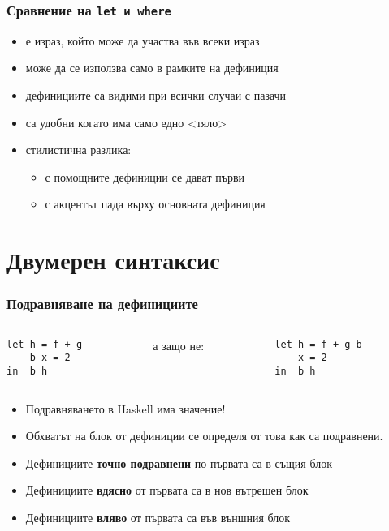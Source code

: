\documentclass[alsotrans,beameroptions={aspectratio=169}]{beamerswitch}
\begin{document}
\begin{frame}
  \frametitle{Сравнение на \tt{let} и \tt{where}}

  \begin{itemize}[<+->]
  \item {} е израз, който може да участва във всеки израз
  \item {} може да се използва само в рамките на дефиниция
  \item {} дефинициите са видими при всички случаи с пазачи
  \item {} са удобни когато има само едно <тяло>
  \item стилистична разлика:
    \begin{itemize}
    \item с  помощните дефиниции се дават първи
    \item с  акцентът пада върху основната дефиниция
    \end{itemize}
  \end{itemize}
\end{frame}

\section{Двумерен синтаксис}

\begin{frame}[fragile]
  \frametitle{Подравняване на дефинициите}

  \begin{columns}[onlytextwidth]
    \begin{column}{0.35\textwidth}
\begin{lstlisting}
let h = f + g
    b x = 2
in  b h
\end{lstlisting}
    \end{column}
    \pause
    \begin{column}{0.3\textwidth}
      а защо не:
    \end{column}
    \begin{column}{0.35\textwidth}
\begin{lstlisting}
let h = f + g b
    x = 2
in  b h
\end{lstlisting}
    \end{column}
  \end{columns}
  \vspace{1em}
\onslide<+->
\begin{itemize}[<+->]
\item \alert{Подравняването в Haskell има значение!}
\item Обхватът на блок от дефиниции се определя от това как са подравнени.
\item Дефинициите \textbf{точно подравнени} по първата са в същия блок
\item Дефинициите \textbf{вдясно} от първата са в нов вътрешен блок
\item Дефинициите \textbf{вляво} от първата са във външния блок
\end{itemize}
\end{frame}
\end{document}
